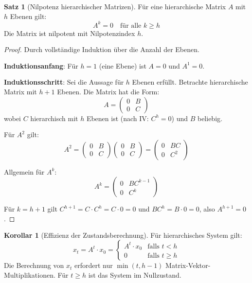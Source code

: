 ﻿\documentclass[a4paper,12pt]{report}
\theoremstyle{definition}
\newtheorem{satz}{Satz}
\newtheorem{korollar}{Korollar}
\begin{document}
	\begin{satz}[Nilpotenz hierarchischer Matrizen]
		Für eine hierarchische Matrix $A$ mit $h$ Ebenen gilt:
		\[
		A^k = 0 \quad \text{für alle } k \geq h
		\]
		Die Matrix ist nilpotent mit Nilpotenzindex $h$.
	\end{satz}
	
	\begin{proof}
		Durch vollständige Induktion über die Anzahl der Ebenen.
		
		\textbf{Induktionsanfang}: Für $h = 1$ (eine Ebene) ist $A = 0$ und $A^1 = 0$.
		
		\textbf{Induktionsschritt}: Sei die Aussage für $h$ Ebenen erfüllt. Betrachte hierarchische Matrix mit $h+1$ Ebenen. Die Matrix hat die Form:
		\[
		A = \begin{pmatrix}
			0 & B \\
			0 & C
		\end{pmatrix}
		\]
		wobei $C$ hierarchisch mit $h$ Ebenen ist (nach IV: $C^h = 0$) und $B$ beliebig.
		
		Für $A^2$ gilt:
		\[
		A^2 = \begin{pmatrix}
			0 & B \\
			0 & C
		\end{pmatrix} \begin{pmatrix}
			0 & B \\
			0 & C
		\end{pmatrix} = \begin{pmatrix}
			0 & BC \\
			0 & C^2
		\end{pmatrix}
		\]
		
		Allgemein für $A^k$:
		\[
		A^k = \begin{pmatrix}
			0 & BC^{k-1} \\
			0 & C^k
		\end{pmatrix}
		\]
		
		Für $k = h+1$ gilt $C^{h+1} = C \cdot C^h = C \cdot 0 = 0$ und $BC^h = B \cdot 0 = 0$, also $A^{h+1} = 0$.
	\end{proof}
	
	\begin{korollar}[Effizienz der Zustandsberechnung]
		Für hierarchisches System gilt:
		\[
		x_t = A^t \cdot x_0 = \begin{cases}
			A^t \cdot x_0 & \text{falls } t < h \\
			0 & \text{falls } t \geq h
		\end{cases}
		\]
		Die Berechnung von $x_t$ erfordert nur $\min(t, h-1)$ Matrix-Vektor-Multiplikationen. Für $t \geq h$ ist das System im Nullzustand.
	\end{korollar}
	
\end{document}
